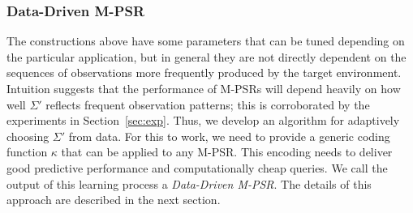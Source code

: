 %

\subsubsection{Data-Driven M-PSR}


The constructions above have some parameters that can be tuned depending on the particular application, but in general they are not directly dependent on the sequences of observations more frequently produced by the target environment. Intuition suggests that the performance of M-PSRs will depend heavily on how well $\Sigma'$ reflects frequent observation patterns; this is corroborated by the experiments in Section~\ref{sec:exp}. Thus, we develop an algorithm for adaptively choosing $\Sigma'$ from data. For this to work, we need to provide a generic coding function $\kappa$ that can be applied to any M-PSR. This encoding needs to deliver good predictive performance and computationally cheap queries. We call the output of this learning process a \emph{Data-Driven M-PSR}. The details of this approach are described in the next section.



